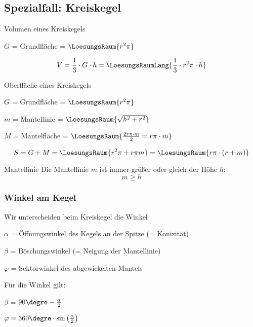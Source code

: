 \subsection{Spezialfall: Kreiskegel}



\begin{gesetz}{Volumen eines Kreiskegels}{}

  $G$ = Grundfläche = $\LoesungsRaum{r^2\pi}$

  $$V = \frac13\cdot{} G\cdot{}h = \LoesungsRaumLang{\frac13 \cdot{} r^2\pi \cdot{} h}$$
\end{gesetz}



\begin{gesetz}{Oberfläche eines Kreiskegels}{}

  $G$ = Grundfläche = $\LoesungsRaum{r^2\pi}$

  $m$ = Mantellinie = $\LoesungsRaum{\sqrt{h^2 + r^2}}$
  
  $M$ = Mantelfläche = $\LoesungsRaum{\frac{2r\pi \cdot{} m}2 = r\pi\cdot{}m}$
  
  $$S = G + M = \LoesungsRaum{r^2\pi + r\pi m} = \LoesungsRaum{r\pi\cdot{}(r+m)}$$
\end{gesetz}


\begin{bemerkung}{Mantellinie}{}
  Die Mantellinie $m$ ist immer größer oder gleich der Höhe $h$:
  $$m \ge{} h$$
\end{bemerkung}

\newpage

\subsubsection{Winkel am Kegel}
\begin{bemerkung}{}{}
  Wir unterscheiden beim Kreiskegel die Winkel

  $\alpha$ = Öffnungswinkel des Kegels an der Spitze (= Konizität)

  $\beta$ = Böschungswinkel (= Neigung der Mantellinie)

  $\varphi$ = Sektorwinkel des abgewickelten Mantels
\end{bemerkung}

\begin{gesetz}{}{}
  Für die Winkel gilt:

  $\beta$ = $90\degre - \frac{\alpha}{2}$

  $\varphi = 360\degre \cdot \sin\left(\frac{\alpha}2\right)$
\end{gesetz}



